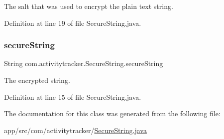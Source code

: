 The salt that was used to encrypt the plain text string. 

Definition at line 19 of file Secure\+String.\+java.

\mbox{\label{classcom_1_1activitytracker_1_1_secure_string_a1448f7b8865c6c57cc7218662ee7f1ee}} 
\subsubsection{\texorpdfstring{secure\+String}{secureString}}
{\footnotesize\ttfamily String com.\+activitytracker.\+Secure\+String.\+secure\+String\hspace{0.3cm}{\ttfamily [private]}}

The encrypted string. 

Definition at line 15 of file Secure\+String.\+java.



The documentation for this class was generated from the following file\+:\begin{DoxyCompactItemize}
\item 
app/src/com/activitytracker/\mbox{\hyperlink{_secure_string_8java}{Secure\+String.\+java}}\end{DoxyCompactItemize}
